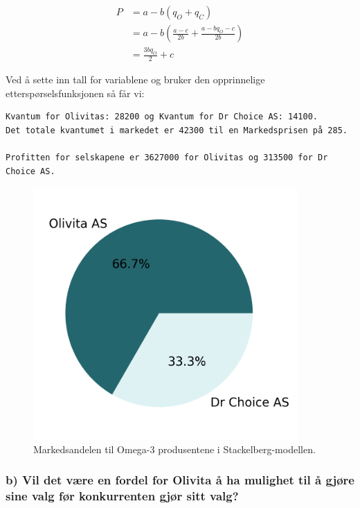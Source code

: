 \documentclass[
  12pt,
  a4paper,
  DIV=11,
  numbers=noendperiod]{scrartcl}
\begin{document}
\begin{align*}
P &= a - b(q_O + q_C) \\
&= a- b \left(\frac{a-c}{2b} + \frac{a- bq_O - c}{2b} \right) \\
&= \frac{3b q_O}{2} + c
\end{align*}

Ved å sette inn tall for variablene og bruker den opprinnelige
etterspørselsfunksjonen så får vi:

\begin{verbatim}
Kvantum for Olivitas: 28200 og Kvantum for Dr Choice AS: 14100. 
Det totale kvantumet i markedet er 42300 til en Markedsprisen på 285.

Profitten for selskapene er 3627000 for Olivitas og 313500 for Dr Choice AS.
\end{verbatim}

\begin{figure}[h]
\centering
\includegraphics[width=0.9\textwidth]{dokumentobjekter/figurer/markedsandel_stackelberg.png}
\caption{Markedsandelen til Omega-3 produsentene i Stackelberg-modellen.}
\label{fig:markedsandel_oppgave1_a}
\end{figure}

\newpage

\subsubsection{b) Vil det være en fordel for Olivita å ha mulighet til å
gjøre sine valg før konkurrenten gjør sitt
valg?}\label{b-vil-det-vuxe6re-en-fordel-for-olivita-uxe5-ha-mulighet-til-uxe5-gjuxf8re-sine-valg-fuxf8r-konkurrenten-gjuxf8r-sitt-valg}
\end{document}

